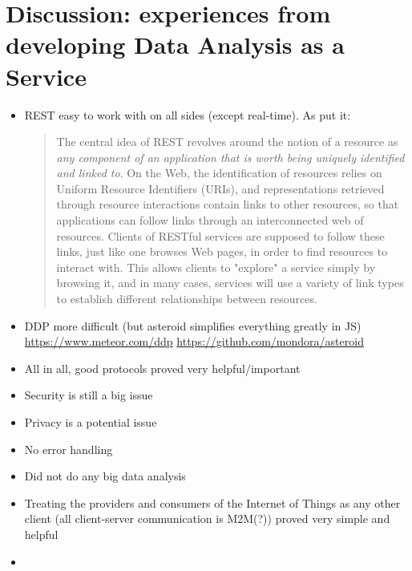 \section{Discussion: experiences from developing Data Analysis as a Service}
\begin{itemize}
    \item REST easy to work with on all sides (except real-time). As     \textcite{uckelmann-harrison-michahelles:architecting-the-internet-of-things:2011} put it:

    \blockquote{The central idea of REST revolves around the notion of a resource as \textit{any component of an application that is worth being uniquely identified and linked to}. On the Web, the identification of resources relies on Uniform Resource Identifiers (URIs), and representations retrieved through resource interactions contain links to other resources, so that applications can follow links through an interconnected web of resources. Clients of RESTful services are supposed to follow these links, just like one browses Web pages, in order to find resources to interact with. This allows clients to "explore" a service simply by browsing it, and in many cases, services will use a variety of link types to establish different relationships between resources.}

    \item DDP more difficult (but asteroid simplifies everything greatly in JS) \url{https://www.meteor.com/ddp} \url{https://github.com/mondora/asteroid}
    \item All in all, good protocols proved very helpful/important
    \item Security is still a big issue
    \item Privacy is a potential issue
    \item No error handling
    \item Did not do any big data analysis
    \item Treating the providers and consumers of the Internet of Things as any other client (all client-server communication is M2M(?)) proved very simple and helpful
    \item 
\end{itemize}